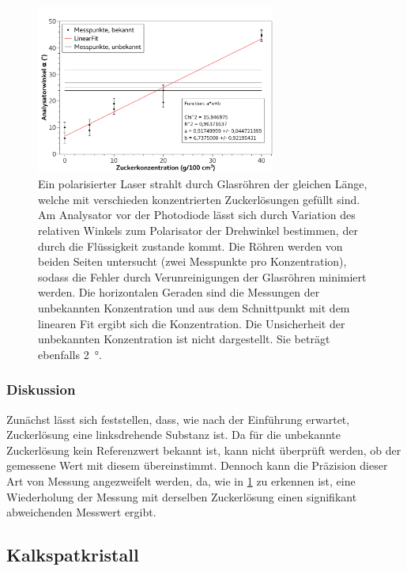 \documentclass[
	a4paper,
	12pt,
	pagesize,
	ngerman
]{scrartcl}
\begin{document}
	\begin{figure}[H]
		\includegraphics[width=0.7\textwidth]{fig_Zucker}
		\centering
		\caption{Ein polarisierter Laser strahlt durch Glasröhren der gleichen Länge, welche mit verschieden konzentrierten Zuckerlösungen gefüllt sind. 
		Am Analysator vor der Photodiode lässt sich durch Variation des relativen Winkels zum Polarisator der Drehwinkel bestimmen, der durch die Flüssigkeit zustande kommt.
		Die Röhren werden von beiden Seiten untersucht (zwei Messpunkte pro Konzentration), sodass die Fehler durch Verunreinigungen der Glasröhren minimiert werden.
		Die horizontalen Geraden sind die Messungen der unbekannten Konzentration und aus dem Schnittpunkt mit dem linearen Fit ergibt sich die Konzentration.
		Die Unsicherheit der unbekannten Konzentration ist nicht dargestellt. Sie beträgt ebenfalls \SI{2}{\degree}.
		}
		\label{fig_zucker}
		\centering
	\end{figure}

	\subsubsection{Diskussion}
	Zunächst lässt sich feststellen, dass, wie nach der Einführung erwartet, Zuckerlösung eine linksdrehende Substanz ist.
	Da für die unbekannte Zuckerlösung kein Referenzwert bekannt ist, kann nicht überprüft werden, ob der gemessene Wert mit diesem übereinstimmt.
	Dennoch kann die Präzision dieser Art von Messung angezweifelt werden, da, wie in \cref{fig_zucker} zu erkennen ist, eine Wiederholung der Messung mit derselben Zuckerlösung einen signifikant abweichenden Messwert ergibt.
	
	\subsection{Kalkspatkristall}
\end{document}
